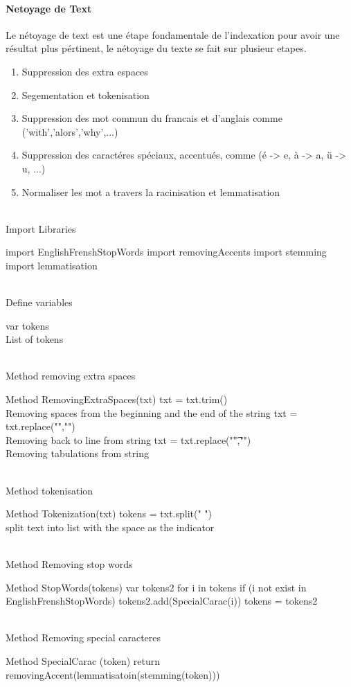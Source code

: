 \documentclass[12pt]{report}
\begin{document}
\paragraph{Netoyage de Text}
Le nétoyage de text est une étape fondamentale de l'indexation pour avoir une résultat plus pértinent, le nétoyage du texte se fait sur plusieur etapes.
\begin{enumerate}
\item Suppression des extra espaces 
\item Segementation et tokenisation
\item Suppression des mot commun du francais et d'anglais comme ('with','alors','why',...)
\item Suppression des caractéres spéciaux, accentués, comme (é -> e, à -> a, ü -> u, ...)
\item Normaliser les mot a travers la racinisation et lemmatisation
\end{enumerate}

\begin{customFrame}
\\ Import Libraries

import EnglishFrenshStopWords
import removingAccents
import stemming
import lemmatisation

\\Define variables

var tokens \\ List of tokens

\\ Method removing extra spaces 

Method RemovingExtraSpaces(txt) {
	txt = txt.trim() \\Removing spaces from the beginning and the end of the string
	txt = txt.replace("\n","") \\Removing back to line from string
	txt = txt.replace("\t","") \\Removing tabulations from string
}

\\ Method tokenisation

Method Tokenization(txt) {
	tokens = txt.split(" ") \\split text into list with the space as the indicator
}

\\ Method Removing stop words

Method StopWords(tokens) {
	var tokens2 
	for i in tokens {
		if (i not exist in EnglishFrenshStopWords)
				tokens2.add(SpecialCarac(i))
	}
	tokens = tokens2
}

\\ Method Removing special caracteres 

Method SpecialCarac (token) {
	return removingAccent(lemmatisatoin(stemming(token)))
}
\end{customFrame}
\end{document}
